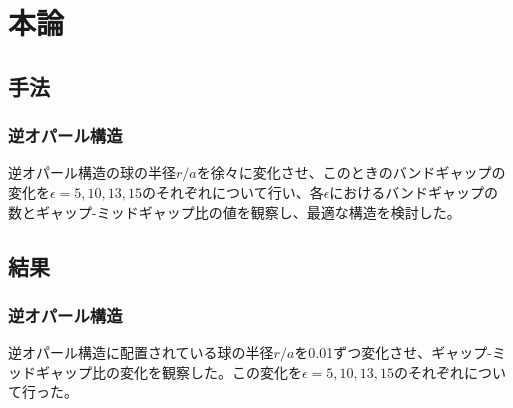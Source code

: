 \documentclass[platex,dvipdfmx]{jsreport}
\numberwithin{equation}{section}
\begin{document}
\chapter{本論}

\section{手法}
\subsection{逆オパール構造}
逆オパール構造の球の半径$r / a$を徐々に変化させ、このときのバンドギャップの変化を$\epsilon = 5, 10, 13, 15$のそれぞれについて行い、各$\epsilon$におけるバンドギャップの数とギャップ-ミッドギャップ比の値を観察し、最適な構造を検討した。



\section{結果}
\subsection{逆オパール構造}
逆オパール構造に配置されている球の半径$r / a$を0.01ずつ変化させ、ギャップ-ミッドギャップ比の変化を観察した。この変化を$\epsilon = 5, 10, 13, 15$のそれぞれについて行った。
\end{document}
